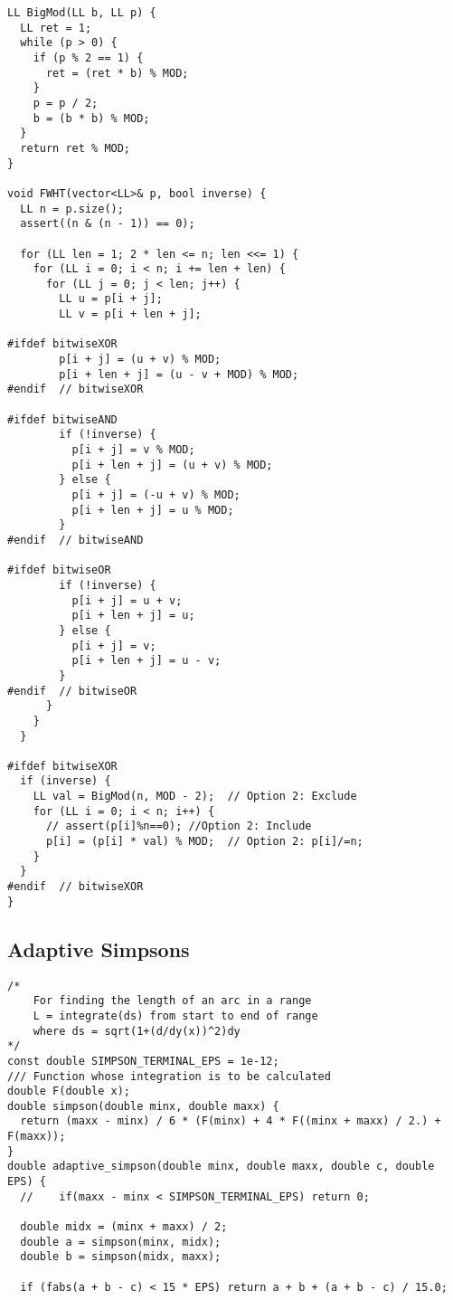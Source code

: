 \documentclass[FSZ,a4paper,onesided]{article}
\begin{document}
\begin{multicols*}{\COLS}
\begin{lstlisting}
LL BigMod(LL b, LL p) {
  LL ret = 1;
  while (p > 0) {
    if (p % 2 == 1) {
      ret = (ret * b) % MOD;
    }
    p = p / 2;
    b = (b * b) % MOD;
  }
  return ret % MOD;
}

void FWHT(vector<LL>& p, bool inverse) {
  LL n = p.size();
  assert((n & (n - 1)) == 0);

  for (LL len = 1; 2 * len <= n; len <<= 1) {
    for (LL i = 0; i < n; i += len + len) {
      for (LL j = 0; j < len; j++) {
        LL u = p[i + j];
        LL v = p[i + len + j];

#ifdef bitwiseXOR
        p[i + j] = (u + v) % MOD;
        p[i + len + j] = (u - v + MOD) % MOD;
#endif  // bitwiseXOR

#ifdef bitwiseAND
        if (!inverse) {
          p[i + j] = v % MOD;
          p[i + len + j] = (u + v) % MOD;
        } else {
          p[i + j] = (-u + v) % MOD;
          p[i + len + j] = u % MOD;
        }
#endif  // bitwiseAND

#ifdef bitwiseOR
        if (!inverse) {
          p[i + j] = u + v;
          p[i + len + j] = u;
        } else {
          p[i + j] = v;
          p[i + len + j] = u - v;
        }
#endif  // bitwiseOR
      }
    }
  }

#ifdef bitwiseXOR
  if (inverse) {
    LL val = BigMod(n, MOD - 2);  // Option 2: Exclude
    for (LL i = 0; i < n; i++) {
      // assert(p[i]%n==0); //Option 2: Include
      p[i] = (p[i] * val) % MOD;  // Option 2: p[i]/=n;
    }
  }
#endif  // bitwiseXOR
}
\end{lstlisting}
\subsection{Adaptive Simpsons}
\begin{lstlisting}
/*
    For finding the length of an arc in a range
    L = integrate(ds) from start to end of range
    where ds = sqrt(1+(d/dy(x))^2)dy
*/
const double SIMPSON_TERMINAL_EPS = 1e-12;
/// Function whose integration is to be calculated
double F(double x);
double simpson(double minx, double maxx) {
  return (maxx - minx) / 6 * (F(minx) + 4 * F((minx + maxx) / 2.) + F(maxx));
}
double adaptive_simpson(double minx, double maxx, double c, double EPS) {
  //    if(maxx - minx < SIMPSON_TERMINAL_EPS) return 0;

  double midx = (minx + maxx) / 2;
  double a = simpson(minx, midx);
  double b = simpson(midx, maxx);

  if (fabs(a + b - c) < 15 * EPS) return a + b + (a + b - c) / 15.0;


\end{lstlisting}
\end{multicols*}
\end{document}
